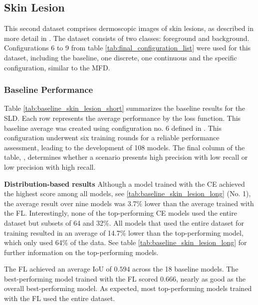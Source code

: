 \subsection{Skin Lesion}
\label{subsec:skin_lesion}
This second dataset comprises dermoscopic images of skin lesions, as described in more detail in . The dataset consists of two classes: foreground and background. Configurations 6 to 9 from table \ref{tab:final_configuration_list} were used for this dataset, including the baseline, one discrete, one continuous and the specific configuration, similar to the \ac{MFD}.

\subsubsection*{Baseline Performance}
\label{subsubsec:baseline_performance_skin_lesion}
Table \ref{tab:baseline_skin_lesion_short} summarizes the baseline results for the \ac{SLD}. Each row represents the average performance by the loss function. This baseline average was created using configuration no. 6 defined in . This configuration underwent six training rounds for a reliable performance assessment, leading to the development of 108 models. The final column of the table, , determines whether a scenario presents high precision with low recall or low precision with high recall.

\textbf{Distribution-based results}\newline
Although a model trained with the \ac{CE} achieved the highest score among all models, see \ref{tab:baseline_skin_lesion_long} (No. 1), the average result over nine models was 3.7\% lower than the average trained with the \ac{FL}. Interestingly, none of the top-performing \ac{CE} models used the entire dataset but subsets of 64 and 32\%. All models that used the entire dataset for training resulted in an average of 14.7\% lower than the top-performing model, which only used 64\% of the data. See table \ref{tab:baseline_skin_lesion_long} for further information on the top-performing models.

The \ac{FL} achieved an average \ac{IoU} of $0.594$ across the 18 baseline models. The best-performing model trained with the \ac{FL} scored $0.666$, nearly as good as the overall best-performing model. As expected, most top-performing models trained with the \ac{FL} used the entire dataset.

